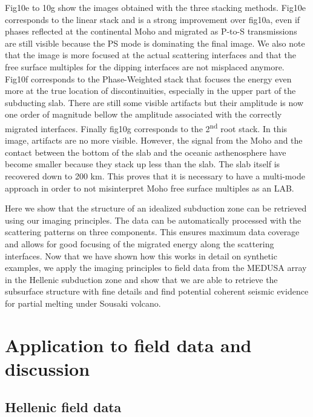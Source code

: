 \documentclass[10pt,a4paper]{article}
\numberwithin{equation}{section}
\begin{document}
Fig10e to 10g show the images obtained with the three stacking methods.
Fig10e corresponds to the linear stack and is a strong improvement over fig10a, even if phases reflected at the continental Moho and migrated as P-to-S transmissions are still visible because the PS mode is dominating the final image.
We also note that the image is more focused at the actual scattering interfaces and that the free surface multiples for the dipping interfaces are not misplaced anymore.
Fig10f corresponds to the Phase-Weighted stack that focuses the energy even more at the true location of discontinuities, especially in the upper part of the subducting slab.
There are still some visible artifacts but their amplitude is now one order of magnitude bellow the amplitude associated with the correctly migrated interfaces.
Finally fig10g corresponds to the 2\textsuperscript{nd} root stack.
In this image, artifacts are no more visible.
However, the signal from the Moho and the contact between the bottom of the slab and the oceanic asthenosphere have become smaller because they stack up less than the slab.
The slab itself is recovered down to 200 km.
This proves that it is necessary to have a multi-mode approach in order to not misinterpret Moho free surface multiples as an LAB.

Here we show that the structure of an idealized subduction zone can be retrieved using our imaging principles.
The data can be automatically processed with the scattering patterns on three components.
This ensures maximum data coverage and allows for good focusing of the migrated energy along the scattering interfaces.
Now that we have shown how this works in detail on synthetic examples, we apply the imaging principles to field data from the MEDUSA array in the Hellenic subduction zone and show that we are able to retrieve the subsurface structure with fine details and find potential coherent seismic evidence for partial melting under Sousaki volcano.

\section{Application to field data and discussion}

\subsection{Hellenic field data}
\end{document}
